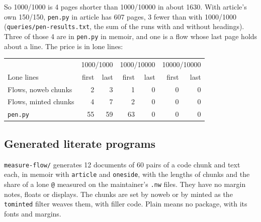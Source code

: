 So 1000/1000 is 4 pages shorter than 1000/10000 in about 1630.
With \textsf{article}'s own 150/150, \texttt{pen.py} in \textsf{article} has 607 pages, 3 fewer
than with 1000/1000 (\texttt{queries/pen-results.txt}, the sum of the runs with and without
headings).
Three of those 4 are in \texttt{pen.py} in \textsf{memoir}, and one is a flow whose last page holds
about a line.
The price is in lone lines:

\begin{center}\small
\begin{tabular}{@{}lrrrrrr@{}}
\toprule
& \multicolumn{2}{c}{1000/1000} & \multicolumn{2}{c}{1000/10000} & \multicolumn{2}{c}{10000/10000} \\
Lone lines & first & last & first & last & first & last \\
\midrule
Flows, \textsf{noweb} chunks & 2 & 3 & 1 & 0 & 0 & 0 \\
Flows, \textsf{minted} chunks & 4 & 7 & 2 & 0 & 0 & 0 \\
\texttt{pen.py} & 55 & 59 & 63 & 0 & 0 & 0 \\
\bottomrule
\end{tabular}
\end{center}

\subsection{Generated literate programs}

\texttt{measure-flow/} generates 12 documents of 60 pairs of a code chunk and text each, in \textsf{memoir} with \texttt{article} and \texttt{oneside}, with the lengths of chunks and the share of a lone \texttt{@} measured on the
maintainer's \texttt{.nw} files.
They have no margin notes, floats or displays.
The chunks are set by \textsf{noweb} or by \textsf{minted} as the \texttt{tominted} filter weaves them,
with filler code.
Plain means no package, with its fonts and margins.


